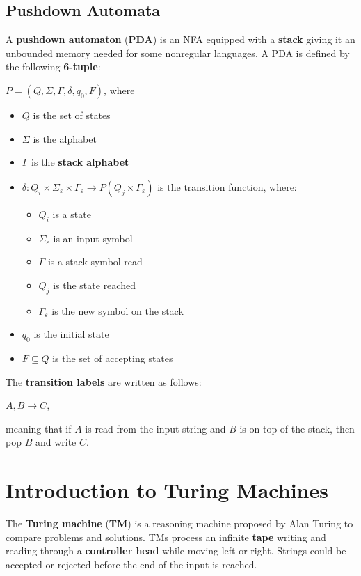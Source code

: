 \documentclass{article}
\begin{document}
\subsection{Pushdown Automata}
A \textbf{pushdown automaton} (\textbf{PDA}) is an NFA equipped with a \textbf{stack} giving it an unbounded memory needed for some nonregular languages. A PDA is defined by the following \textbf{6-tuple}:
\begin{center}
    $P = (Q, \Sigma, \Gamma, \delta, q_0, F)$, where
\end{center}
\begin{itemize}
    \item $Q$ is the set of states
    \item $\Sigma$ is the alphabet
    \item $\Gamma$ is the \textbf{stack alphabet}
    \item $\delta:Q_i\times\Sigma_\varepsilon\times\Gamma_\varepsilon\rightarrow P(Q_j\times\Gamma_{\varepsilon})$ 
    is the transition function, where:
        \begin{itemize}
            \item $Q_i$ is a state
            \item $\Sigma_\varepsilon$ is an input symbol
            \item $\Gamma$ is a stack symbol read
            \item $Q_j$ is the state reached
            \item $\Gamma_\varepsilon$ is the new symbol on the stack 
        \end{itemize}
    \item $q_0$ is the initial state
    \item $F \subseteq Q$ is the set of accepting states
\end{itemize}
The \textbf{transition labels} are written as follows:
\begin{center}
    $A,B \rightarrow C$,
\end{center}
meaning that if $A$ is read from the input string and $B$ is on top of the stack, then pop $B$ and write $C$.

\newpage

\section{Introduction to Turing Machines}
The \textbf{Turing machine} (\textbf{TM}) is a reasoning machine proposed by Alan Turing to compare problems and solutions. TMs process an infinite \textbf{tape} writing and reading through a \textbf{controller head} while moving left or right. Strings could be accepted or rejected before the end of the input is reached.
\end{document}

